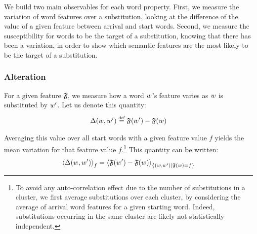 We build two main observables for each word property. First, we measure the variation of word features over a substitution, looking at the difference of the value of a given feature between arrival and start words. %
Second, we measure the susceptibility for words to be the target of a substitution, knowing that there has been a variation, in order to show which semantic features are the most likely to be the target of a substitution. %

\subsubsection{Alteration}
For a given feature $\mathfrak{F}$, we measure how a word $w$'s feature varies as $w$ is substituted by $w'$. Let us denote this quantity:
$$\Delta (w,w') \overset{\underset{\mathrm{def}}{}}{=} \mathfrak{F}(w') - \mathfrak{F}(w)$$

Averaging this value over all start words with a given feature value $f$ yields the mean variation for that feature value $f$.\footnote{To avoid any auto-correlation effect due to the number of substitutions in a cluster, we first average substitutions over each cluster, by considering the average of arrival word features for a given starting word. Indeed, substitutions occurring in the same cluster are likely not statistically independent.} This 
quantity can be written:
$$\left< \Delta(w,w') \right>_f = \left< \mathfrak{F}(w') - \mathfrak{F}(w) \right>_{\left\lbrace (w,w') | \mathfrak{F}(w) = f \right\rbrace}$$

